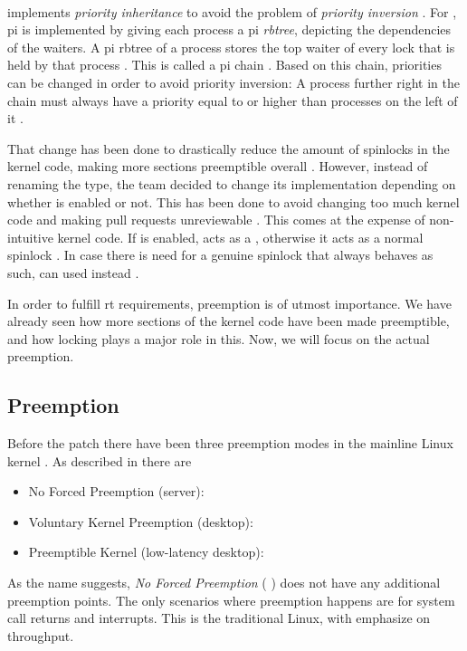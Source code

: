 \documentclass[10pt,twocolumn,a4paper]{article}
\begin{document}
\paragraph{} implements \emph{priority inheritance} to avoid the problem of \emph{priority inversion} \cite{rostedt_rtmutex_2017}.
For , \acrfull{pi} is implemented by giving each process a \acrshort{pi} \emph{rbtree}, depicting the dependencies of the waiters.
A \acrshort{pi} rbtree of a process stores the top waiter of every lock that is held by that process \cite{rostedt_rtmutex_2017}.
This is called a \acrshort{pi} chain \cite{rostedt_rtmutex_2017}.
Based on this chain, priorities can be changed in order to avoid priority inversion:
A process further right in the chain must always have a priority equal to or higher than processes on the left of it \cite{rostedt_rtmutex_2017}.
\newline

\noindent That change has been done to drastically reduce the amount of spinlocks in the kernel code, making more sections preemptible overall \cite{lf:sleeping-spinlocks}.
However, instead of renaming the type, the team decided to change its implementation depending on whether  is enabled or not.
This has been done to avoid changing too much kernel code and making pull requests unreviewable \cite{reghenzani_realtime_2019}.
This comes at the expense of non-intuitive kernel code.
If  is enabled,  acts as a , otherwise it acts as a normal spinlock \cite{mckenney_realtime_2005}.
In case there is need for a genuine spinlock that always behaves as such,  can used instead \cite{mckenney_realtime_2005, chyyuu_github_2017}.
\newline

\noindent In order to fulfill \acrshort{rt} requirements, preemption is of utmost importance.
We have already seen how more sections of the kernel code have been made preemptible, and how locking plays a major role in this.
Now, we will focus on the actual preemption.

\subsection{Preemption}
Before the  patch there have been three preemption modes in the mainline Linux kernel \cite{lf:preemption}.
As described in \cite{lf:preemption} there are
\begin{itemize}
  \item No Forced Preemption (server):
  \item Voluntary Kernel Preemption (desktop):
  \item Preemptible Kernel (low-latency desktop):
\end{itemize}
As the name suggests, \emph{No Forced Preemption} ( \cite{mckenney_realtime_2005}) does not have any additional preemption points.
The only scenarios where preemption happens are for system call returns and interrupts.
This is the traditional Linux, with emphasize on throughput.
\end{document}
